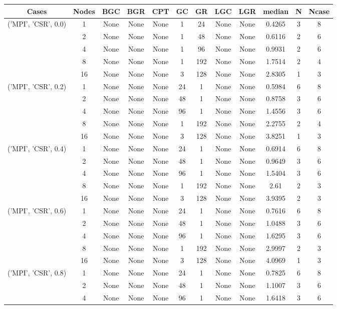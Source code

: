 \begin{tabular}{cccccccccccc}
\hline
Cases & Nodes& BGC& BGR& CPT& GC& GR& LGC& LGR& median & N & Ncase \\
\hline
\multirow{5}{*}{('MPI', 'CSR', 0.0)}& 1& None& None& None& 1& 24& None& None& 0.4265& 3& 8\\
& 2& None& None& None& 1& 48& None& None& 0.6116& 2& 6\\
& 4& None& None& None& 1& 96& None& None& 0.9931& 2& 6\\
& 8& None& None& None& 1& 192& None& None& 1.7514& 2& 4\\
& 16& None& None& None& 3& 128& None& None& 2.8305& 1& 3\\
\hline
\multirow{5}{*}{('MPI', 'CSR', 0.2)}& 1& None& None& None& 24& 1& None& None& 0.5984& 6& 8\\
& 2& None& None& None& 48& 1& None& None& 0.8758& 3& 6\\
& 4& None& None& None& 96& 1& None& None& 1.4556& 3& 6\\
& 8& None& None& None& 1& 192& None& None& 2.2755& 2& 4\\
& 16& None& None& None& 3& 128& None& None& 3.8251& 1& 3\\
\hline
\multirow{5}{*}{('MPI', 'CSR', 0.4)}& 1& None& None& None& 24& 1& None& None& 0.6914& 6& 8\\
& 2& None& None& None& 48& 1& None& None& 0.9649& 3& 6\\
& 4& None& None& None& 96& 1& None& None& 1.5404& 3& 6\\
& 8& None& None& None& 1& 192& None& None& 2.61& 2& 3\\
& 16& None& None& None& 3& 128& None& None& 3.9395& 2& 3\\
\hline
\multirow{5}{*}{('MPI', 'CSR', 0.6)}& 1& None& None& None& 24& 1& None& None& 0.7616& 6& 8\\
& 2& None& None& None& 48& 1& None& None& 1.0488& 3& 6\\
& 4& None& None& None& 96& 1& None& None& 1.6295& 3& 6\\
& 8& None& None& None& 1& 192& None& None& 2.9997& 2& 3\\
& 16& None& None& None& 3& 128& None& None& 4.0969& 1& 3\\
\hline
\multirow{5}{*}{('MPI', 'CSR', 0.8)}& 1& None& None& None& 24& 1& None& None& 0.7825& 6& 8\\
& 2& None& None& None& 48& 1& None& None& 1.1007& 3& 6\\
& 4& None& None& None& 96& 1& None& None& 1.6418& 3& 6\\

\end{tabular}
